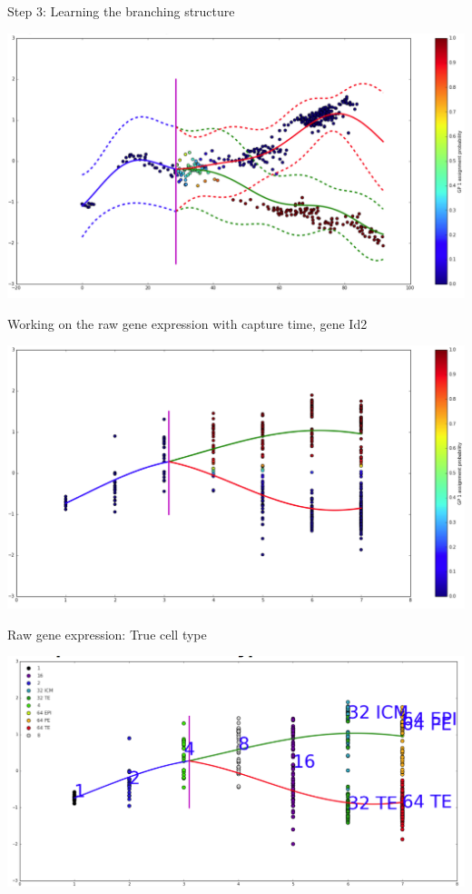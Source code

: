 \documentclass[ignorenonframetext]{beamer}
\begin{document}
\begin{frame}{Step 3: Learning the branching structure}
 \begin{center}
 \includegraphics[width=.75\textwidth]{branchingJoint}      
 \end{center}
\end{frame}    

\begin{frame}{Working on the raw gene expression with capture time, gene Id2}
 \begin{center}
 \includegraphics[width=.75\textwidth]{captureTimes}      
 \end{center}
\end{frame}    


\begin{frame}{Raw gene expression: True cell type}
 \begin{center}
 \includegraphics[width=.75\textwidth]{captureTimesGroundTruth}      
 \end{center}
\end{frame}    
\end{document}
